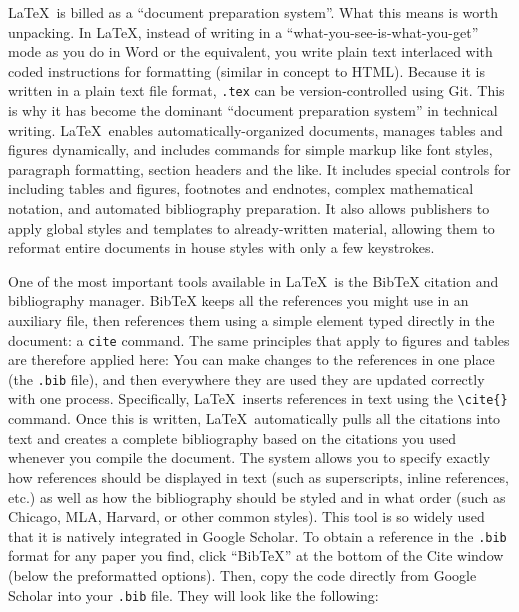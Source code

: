 \LaTeX\ is billed as a ``document preparation system''.
What this means is worth unpacking.
In {\LaTeX}, instead of writing in a ``what-you-see-is-what-you-get'' mode
as you do in Word or the equivalent,
you write plain text interlaced with coded instructions for formatting
(similar in concept to HTML).
Because it is written in a plain text file format,
\texttt{.tex} can be version-controlled using Git.
This is why it has become the dominant ``document preparation system'' in technical writing.
\LaTeX\ enables automatically-organized documents,
manages tables and figures dynamically,
and includes commands for simple markup
like font styles, paragraph formatting, section headers and the like.
It includes special controls for including tables and figures,
footnotes and endnotes, complex mathematical notation, and automated bibliography preparation.
It also allows publishers to apply global styles and templates to already-written material,
allowing them to reformat entire documents in house styles with only a few keystrokes.

One of the most important tools available in \LaTeX\
is the BibTeX citation and bibliography manager.
BibTeX keeps all the references you might use in an auxiliary file,
then references them using a simple element typed directly in the document: a \texttt{cite} command.
The same principles that apply to figures and tables are therefore applied here:
You can make changes to the references in one place (the \texttt{.bib} file),
and then everywhere they are used they are updated correctly with one process.
Specifically, \LaTeX\ inserts references in text using the \texttt{\textbackslash cite\{\}} command.
Once this is written, \LaTeX\ automatically pulls all the citations into text
and creates a complete bibliography based on the citations you used whenever you compile the document.
The system allows you to specify exactly how references should be displayed in text
(such as superscripts, inline references, etc.)
as well as how the bibliography should be styled and in what order
(such as Chicago, MLA, Harvard, or other common styles).
This tool is so widely used that it is natively integrated in Google Scholar.
To obtain a reference in the \texttt{.bib} format for any paper you find,
click ``BibTeX'' at the bottom of the Cite window (below the preformatted options).
Then, copy the code directly from Google Scholar into your \texttt{.bib} file.
They will look like the following:

